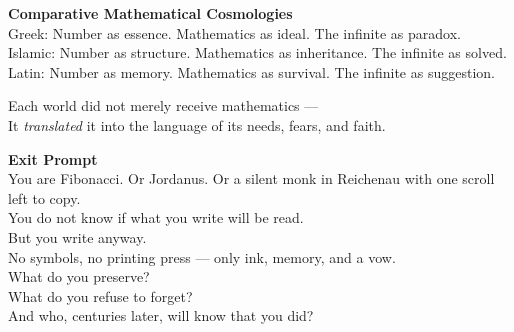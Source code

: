 \documentclass[9pt]{article}
\begin{document}
\vspace{1em}

\textbf{Comparative Mathematical Cosmologies} \\

Greek: Number as essence. Mathematics as ideal. The infinite as paradox. \\

Islamic: Number as structure. Mathematics as inheritance. The infinite as solved. \\

Latin: Number as memory. Mathematics as survival. The infinite as suggestion.

\vspace{1em}

Each world did not merely receive mathematics ---  \\

It \textit{translated} it into the language of its needs, fears, and faith.

\vspace{1em}

\textbf{Exit Prompt} \\

You are Fibonacci. Or Jordanus. Or a silent monk in Reichenau with one scroll left to copy. \\

You do not know if what you write will be read.\\

But you write anyway.\\

No symbols, no printing press --- only ink, memory, and a vow. \\

What do you preserve? \\

What do you refuse to forget? \\

And who, centuries later, will know that you did?
\end{document}
